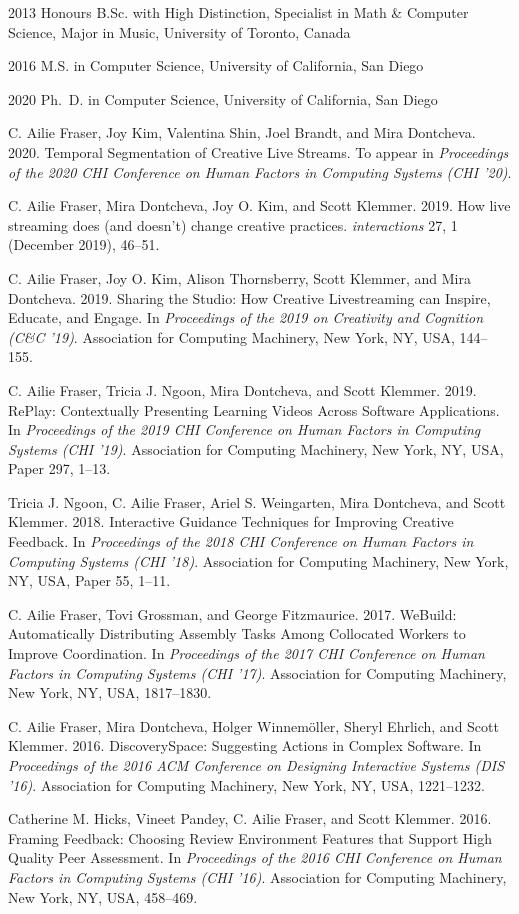 \begin{vita}
  \item[2013] Honours B.Sc. with High Distinction, Specialist in Math \& Computer Science, Major in Music, University of Toronto, Canada
  \item[2016] M.S. in Computer Science, University of California, San Diego
  \item[2020] Ph.~D. in Computer Science, University of California, San Diego
\end{vita}
\begin{publications}
\item C. Ailie Fraser, Joy Kim, Valentina Shin, Joel Brandt, and Mira Dontcheva. 2020. Temporal Segmentation of Creative Live Streams. To appear in \textit{Proceedings of the 2020 CHI Conference on Human Factors in Computing Systems (CHI '20)}.
\item C. Ailie Fraser, Mira Dontcheva, Joy O. Kim, and Scott Klemmer. 2019. How live streaming does (and doesn't) change creative practices. \textit{interactions} 27, 1 (December 2019), 46–51.
\item C. Ailie Fraser, Joy O. Kim, Alison Thornsberry, Scott Klemmer, and Mira Dontcheva. 2019. Sharing the Studio: How Creative Livestreaming can Inspire, Educate, and Engage. In \textit{Proceedings of the 2019 on Creativity and Cognition (C\&C '19)}. Association for Computing Machinery, New York, NY, USA, 144–155.
\item C. Ailie Fraser, Tricia J. Ngoon, Mira Dontcheva, and Scott Klemmer. 2019. RePlay: Contextually Presenting Learning Videos Across Software Applications. In \textit{Proceedings of the 2019 CHI Conference on Human Factors in Computing Systems (CHI '19)}. Association for Computing Machinery, New York, NY, USA, Paper 297, 1–13.
\item Tricia J. Ngoon, C. Ailie Fraser, Ariel S. Weingarten, Mira Dontcheva, and Scott Klemmer. 2018. Interactive Guidance Techniques for Improving Creative Feedback. In \textit{Proceedings of the 2018 CHI Conference on Human Factors in Computing Systems (CHI '18)}. Association for Computing Machinery, New York, NY, USA, Paper 55, 1–11.
\item C. Ailie Fraser, Tovi Grossman, and George Fitzmaurice. 2017. WeBuild: Automatically Distributing Assembly Tasks Among Collocated Workers to Improve Coordination. In \textit{Proceedings of the 2017 CHI Conference on Human Factors in Computing Systems (CHI '17)}. Association for Computing Machinery, New York, NY, USA, 1817–1830.
\item C. Ailie Fraser, Mira Dontcheva, Holger Winnemöller, Sheryl Ehrlich, and Scott Klemmer. 2016. DiscoverySpace: Suggesting Actions in Complex Software. In \textit{Proceedings of the 2016 ACM Conference on Designing Interactive Systems (DIS '16)}. Association for Computing Machinery, New York, NY, USA, 1221–1232.
\item Catherine M. Hicks, Vineet Pandey, C. Ailie Fraser, and Scott Klemmer. 2016. Framing Feedback: Choosing Review Environment Features that Support High Quality Peer Assessment. In \textit{Proceedings of the 2016 CHI Conference on Human Factors in Computing Systems (CHI '16)}. Association for Computing Machinery, New York, NY, USA, 458–469.
\end{publications}